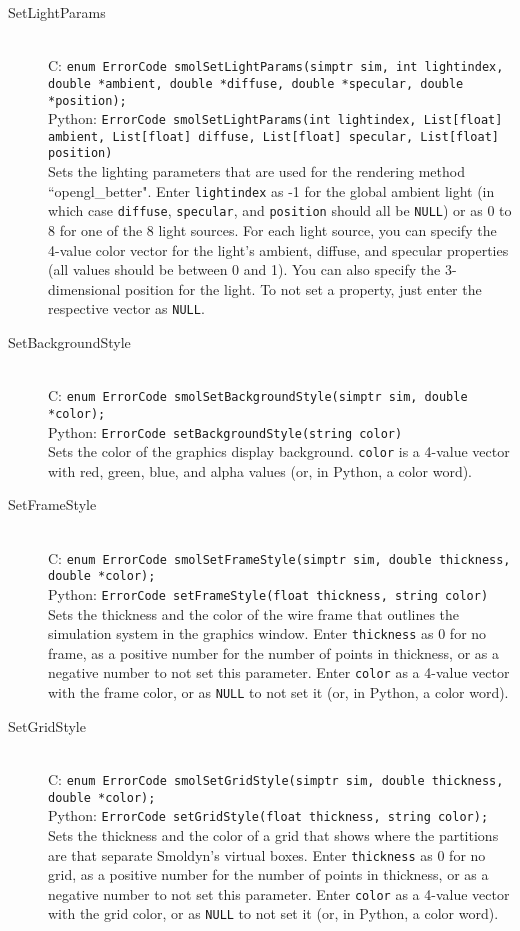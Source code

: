 \documentclass {book}
\begin{document}
\begin{description}
\item[SetLightParams]
\hfill \\
C: \texttt{enum ErrorCode smolSetLightParams(simptr sim, int lightindex, double *ambient, double *diffuse, double *specular, double *position);}\\
Python: \texttt{ErrorCode smolSetLightParams(int lightindex, List[float] ambient, List[float] diffuse, List[float] specular, List[float] position)}\\
Sets the lighting parameters that are used for the rendering method ``opengl\_better". Enter \texttt{lightindex} as -1 for the global ambient light (in which case \texttt{diffuse}, \texttt{specular}, and \texttt{position} should all be \texttt{NULL}) or as 0 to 8 for one of the 8 light sources. For each light source, you can specify the 4-value color vector for the light's ambient, diffuse, and specular properties (all values should be between 0 and 1). You can also specify the 3-dimensional position for the light. To not set a property, just enter the respective vector as \texttt{NULL}.

\item[SetBackgroundStyle]
\hfill \\
C: \texttt{enum ErrorCode smolSetBackgroundStyle(simptr sim, double *color);}\\
Python: \texttt{ErrorCode setBackgroundStyle(string color)}\\
Sets the color of the graphics display background. \texttt{color} is a 4-value vector with red, green, blue, and alpha values (or, in Python, a color word).

\item[SetFrameStyle]
\hfill \\
C: \texttt{enum ErrorCode smolSetFrameStyle(simptr sim, double thickness, double *color);}\\
Python: \texttt{ErrorCode setFrameStyle(float thickness, string color)}\\
Sets the thickness and the color of the wire frame that outlines the simulation system in the graphics window. Enter \texttt{thickness} as 0 for no frame, as a positive number for the number of points in thickness, or as a negative number to not set this parameter. Enter \texttt{color} as a 4-value vector with the frame color, or as \texttt{NULL} to not set it (or, in Python, a color word).

\item[SetGridStyle]
\hfill \\
C: \texttt{enum ErrorCode smolSetGridStyle(simptr sim, double thickness, double *color);}\\
Python: \texttt{ErrorCode setGridStyle(float thickness, string color);}\\
Sets the thickness and the color of a grid that shows where the partitions are that separate Smoldyn's virtual boxes. Enter \texttt{thickness} as 0 for no grid, as a positive number for the number of points in thickness, or as a negative number to not set this parameter. Enter \texttt{color} as a 4-value vector with the grid color, or as \texttt{NULL} to not set it (or, in Python, a color word).


\end{description}
\end{document}
